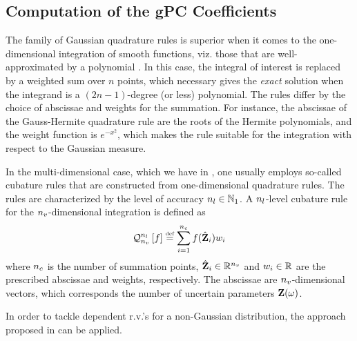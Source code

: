 \subsection{Computation of the gPC Coefficients} 
The family of Gaussian quadrature rules is superior when it comes to the one-dimensional integration of smooth functions, viz. those that are well-approximated by a polynomial \cite{press2007}. In this case, the integral of interest is replaced by a weighted sum over $n$ points, which necessary gives the \emph{exact} solution when the integrand is a $(2n - 1)$-degree (or less) polynomial. The rules differ by the choice of abscissae and weights for the summation. For instance, the abscissae of the Gauss-Hermite quadrature rule are the roots of the Hermite polynomials, and the weight function is $e^{-x^2}$, which makes the rule suitable for the integration with respect to the Gaussian measure.

In the multi-dimensional case, which we have in , one usually employs so-called cubature rules that are constructed from one-dimensional quadrature rules. The rules are characterized by the level of accuracy ${n_l} \in \mathbb{N}_{1}$. A ${n_l}$-level cubature rule for the ${n_v}$-dimensional integration is defined as
\[
  \mathcal{Q}_{{n_v}}^{{n_l}}\left[f\right] \stackrel{\text{\tiny def}}{=} \sum_{i = 1}^{{n_c}} f(\hat{\mathbf{Z}}_i) w_i
\]
where ${n_c}$ is the number of summation points, $\hat{\mathbf{Z}}_i \in \mathbb{R}^{n_v}$ and $w_i \in \mathbb{R}$ are the prescribed abscissae and weights, respectively. The abscissae are ${n_v}$-dimensional vectors, which corresponds the number of uncertain parameters $\mathbf{Z}(\omega)$.

In order to tackle dependent r.v.'s for a non-Gaussian distribution, the approach proposed in \cite{babuska2010} can be applied.
